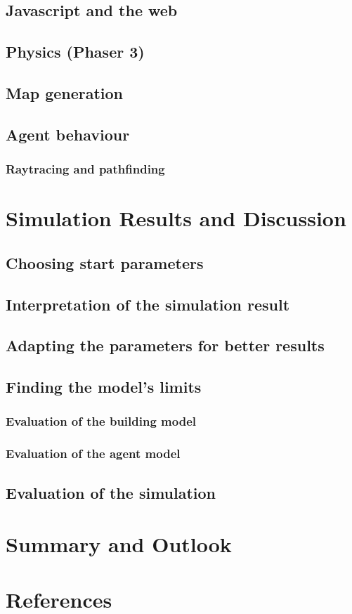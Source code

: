\documentclass[11pt]{article}
\begin{document}
\subsection{Javascript and the web}

\subsection{Physics (Phaser 3)}

\subsection{Map generation}

\subsection{Agent behaviour}

\subsubsection{Raytracing and pathfinding}

\section{Simulation Results and Discussion}

\subsection{Choosing start parameters}

\subsection{Interpretation of the simulation result}

\subsection{Adapting the parameters for better results}

\subsection{Finding the model's limits}

\subsubsection{Evaluation of the building model}
\subsubsection{Evaluation of the agent model}

\subsection{Evaluation of the simulation}

\section{Summary and Outlook}

\section{References}
\end{document}
